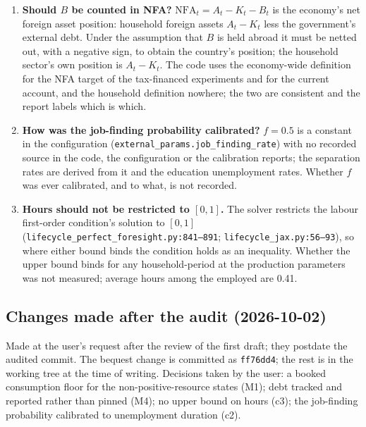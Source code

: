 \documentclass[11pt,a4paper]{article}
\newcommand{\code}[1]{\texttt{#1}}
\begin{document}
\begin{enumerate}[label=c\arabic*.]
\item \textbf{Should $B$ be counted in NFA?} $\mathrm{NFA}_t = A_t - K_t - B_t$ is the economy's net foreign asset position: household foreign assets $A_t - K_t$ less the government's external debt. Under the assumption that $B$ is held abroad it must be netted out, with a negative sign, to obtain the country's position; the household sector's own position is $A_t - K_t$. The code uses the economy-wide definition for the NFA target of the tax-financed experiments and for the current account, and the household definition nowhere; the two are consistent and the report labels which is which.
\item \textbf{How was the job-finding probability calibrated?} $f = 0.5$ is a constant in the configuration (\code{external_params.job_finding_rate}) with no recorded source in the code, the configuration or the calibration reports; the separation rates are derived from it and the education unemployment rates. Whether $f$ was ever calibrated, and to what, is not recorded.
\item \textbf{Hours should not be restricted to $[0, 1]$.} The solver restricts the labour first-order condition's solution to $[0, 1]$ (\code{lifecycle_perfect_foresight.py:841--891}; \code{lifecycle_jax.py:56--93}), so where either bound binds the condition holds as an inequality. Whether the upper bound binds for any household-period at the production parameters was not measured; average hours among the employed are 0.41.
\end{enumerate}

\subsection{Changes made after the audit (2026-10-02)}\label{sec:postaudit}

Made at the user's request after the review of the first draft; they postdate the audited commit. The bequest change is committed as \code{ff76dd4}; the rest is in the working tree at the time of writing. Decisions taken by the user: a booked consumption floor for the non-positive-resource states (M1); debt tracked and reported rather than pinned (M4); no upper bound on hours (c3); the job-finding probability calibrated to unemployment duration (c2).
\end{document}
